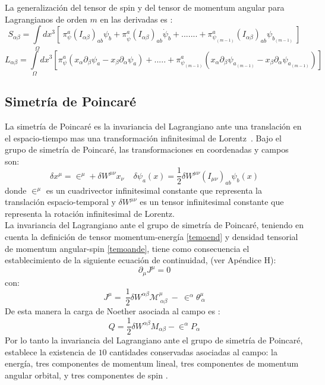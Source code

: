 \documentclass[a4paper,12pt]{article}
\begin{document}
La generalización del tensor de spin y del tensor de momentum angular para Lagrangianos de orden $m$ en las derivadas es \cite{general,podolsky}:
\begin{equation}
S_{\alpha\beta}=\int\limits_{\Omega}dx^{3}\left[\ \pi^{a}_{\psi}(I_{\alpha\beta})_{ab}\psi_{b}+\pi^{a}_{\dot\psi}(I_{\alpha\beta})_{ab}\dot\psi_{b}+.......+\pi^{a}_{\psi_{(m-1)}}(I_{\alpha\beta})_{ab}\psi_{b_{(m-1)}}\ \right] 
\end{equation}
$$
L_{\alpha\beta}=\int\limits_{\Omega}dx^{3}\left[\pi^{a}_{\psi}(x_{\alpha}\partial_{\beta}\psi_a-x_{\beta}\partial_{\alpha}\psi_a)+.....+\pi^{a}_{\psi_{(m-1)}}(x_{\alpha}\partial_{\beta}\psi_{a_{(m-1)}}-x_{\beta}\partial_{\alpha}\psi_{a_{(m-1)}})\right]
$$
\subsection{Simetría de Poincaré}
La simetría de Poincaré es la invariancia del Lagrangiano ante una translación en el \mbox{espacio-tiempo} mas una transformación infinitesimal de \mbox{Lorentz \cite{greiner}}. Bajo el grupo de simetría de Poincaré, las transformaciones en coordenadas y campos son:
\begin{equation}
\delta x^{\mu}=\in^{\mu}+\delta W^{\mu \nu}x_\nu\ \ \ \ \ \delta\psi_{a}(x)=\frac{1}{2}\delta W^{\mu \nu}(I_{\mu \nu})_{ab}\psi_{b}(x)   
\label{poi}
\end{equation}
donde $\in^{\mu}$ es un cuadrivector infinitesimal constante que representa la translación espacio-temporal y $\delta W^{\mu \nu}$ es un tensor infinitesimal constante que representa la rotación infinitesimal de Lorentz.   
\\

La invariancia del Lagrangiano ante el grupo de simetría de Poincaré, teniendo en cuenta la definición de tensor momentum-energía \eqref{temoend} y densidad tensorial de momentum \mbox{angular-spin} \eqref{temoande}, tiene como consecuencia el establecimiento de la siguiente ecuación de continuidad, (ver Apéndice H):
\begin{equation}
\partial_\mu J^{\mu}=0  
\end{equation}
con:
\begin{equation}
J^\mu=\ \frac{1}{2}\delta W^{\alpha\beta}\mathscr{M}_{\ \alpha\beta}^\mu\ -\ \in^{\alpha}\theta_{\ \alpha}^\mu 
\end{equation}
De esta manera la carga de Noether asociada al campo es \cite{greiner}:
\begin{equation}
Q=\frac{1}{2}\delta W^{\alpha\beta}M_{\alpha\beta}-\in^{\alpha}P_{\alpha}
\end{equation}
Por lo tanto la invariancia del Lagrangiano ante el grupo de simetría de Poincaré, establece la existencia de $10$ cantidades conservadas asociadas al campo: la energía, tres componentes de momentum lineal, tres componentes de momentum angular orbital, y tres componentes de spin \cite{greiner}. 
\\
\end{document}
